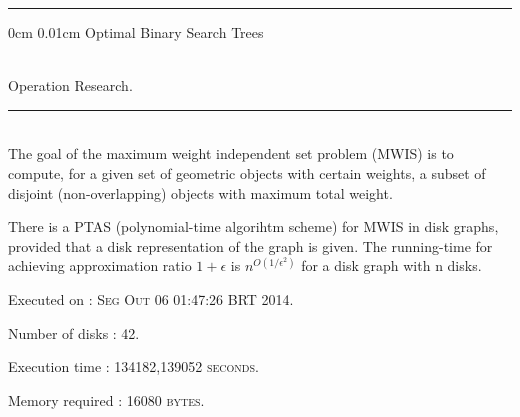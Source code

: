 \documentclass{article}
\makeatletter
\newcommand{\HRule}{\noindent\rule{\linewidth}{0.5mm}}
\renewcommand\section{\@startsection
  {section}{1}{0mm}%
  {0cm}%
  {0.01cm}%
  {\Huge\bfseries\color{black}}}%
\makeatother
\begin{document}
\HRule

\section{Optimal Binary Search Trees}

 \\[0.4cm]
{\LARGE Operation Research.}\\[0.4cm]
\HRule \\[0.5cm]
\indent The goal of the maximum weight independent set problem (MWIS) is to compute, for a given set of geometric objects with certain weights, a subset of disjoint (non-overlapping) objects with maximum total weight.

There is a PTAS (polynomial-time algorihtm scheme) for MWIS in disk graphs, provided that a disk representation of the graph is given. 
The running-time for achieving approximation ratio $1+\epsilon$ 
is $n^{O(1/\epsilon^{2})}$ for a disk graph with n disks.\\[0.5cm]
\begin{compactitem}
\item Executed on : \textsc{Seg Out 06 01:47:26 BRT 2014}. 
\item Number of disks : \textsc{42}. 
\item Execution time : \textsc{134182,139052 seconds}. 
\item Memory required : \textsc{16080 bytes}. 
\end{compactitem}
\end{document}

